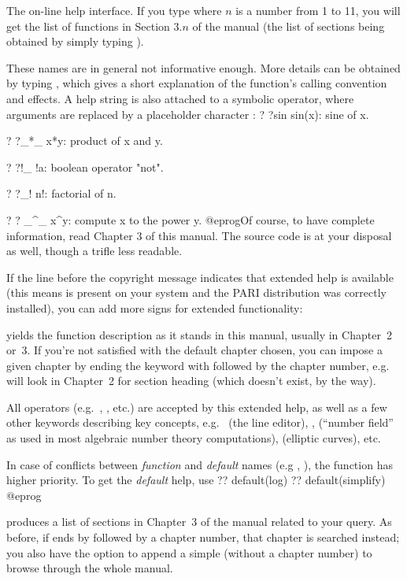  The  on-line help interface.
If you type  where $n$ is a number from 1 to 11, you will get the
list of functions in Section $3.n$ of the manual (the list of sections being
obtained by simply typing ). \label{se:exthelp}

These names are in general not informative enough. More details can be
obtained by typing , which gives a short explanation of
the function's calling convention and effects. A help string is also attached
to a symbolic operator, where arguments are replaced by a placeholder
character \kbd{\_}:
\bprog
 ?  ?sin
 sin(x): sine of x.

 ?  ?_*_
 x*y: product of x and y.

 ?  ?!_
 !a: boolean operator "not".

 ?  ?_!
 n!: factorial of n.

 ?  ? _^_
 x^y: compute x to the power y.
 @eprog\noindent Of course, to have complete information, read Chapter 3 of
this manual. The source code is at your disposal as well, though a trifle
less readable.

If the line before the copyright message indicates that extended help is
available (this means  is present on your system and the PARI
distribution was correctly installed), you can add more  signs for
extended functionality:

 yields the function description as it stands in this
manual, usually in Chapter~2 or~3. If you're not satisfied with the default
chapter chosen, you can impose a given chapter by ending the keyword with
 followed by the chapter number, e.g.~ will look in
Chapter~2 for section heading  (which doesn't exist, by the way).

All operators (e.g.~\kbd{+}, \kbd{\&\&}, etc.) are accepted by this
extended help, as well as a few other keywords describing key  concepts,
e.g.~ (the line editor), ,  (``number
field'' as used in most algebraic number theory computations), 
(elliptic curves), etc.

In case of conflicts between \emph{function} and \emph{default} names (e.g
, ), the function has higher priority. To get the
\emph{default} help, use
\bprog
  ?? default(log)
  ?? default(simplify)
@eprog

 produces a list of sections in Chapter~3 of the
manual related to your query. As before, if  ends by 
followed by a chapter number, that chapter is searched instead; you also
have the option to append a simple  (without a chapter number) to
browse through the whole manual.

